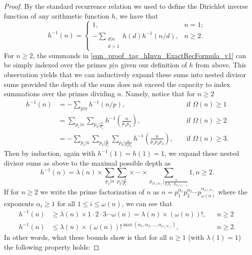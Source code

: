 \documentclass[11pt,reqno,a4letter]{article}
\numberwithin{figure}{section}
\numberwithin{table}{section}
\theoremstyle{plain}
\numberwithin{theorem}{section}
\theoremstyle{definition}
\begin{document}
\begin{proof}
By the standard recurrence relation we used to define the Dirichlet inverse function of any 
arithmetic function $h$, we have that \cite[\S 2.7]{APOSTOLANUMT} 
\begin{equation} 
\label{eqn_proof_tag_hInvn_ExactRecFormula_v1}
h^{-1}(n) = \begin{cases} 
            1, & n = 1; \\ 
            -\sum\limits_{\substack{d|n \\ d>1}} h(d) h^{-1}(n/d), & n \geq 2. 
            \end{cases} 
\end{equation} 
For $n \geq 2$, the summands in \eqref{eqn_proof_tag_hInvn_ExactRecFormula_v1} 
can be simply indexed over the primes $p|n$ given our definition of $h$ from above. 
This observation yields that we can inductively 
expand these sums into nested divisor sums provided the depth of the sums does not exceed the 
capacity to index summations over the primes dividing $n$. Namely, notice that for $n \geq 2$ 
\begin{align*} 
h^{-1}(n) & = -\sum_{p|n} h^{-1}(n/p), && \text{\ if\ } \Omega(n) \geq 1 \\ 
     & = \sum_{p_1|n} \sum_{p_2|\frac{n}{p_1}} h^{-1}\left(\frac{n}{p_1p_2}\right), && \text{\ if\ } \Omega(n) \geq 2 \\ 
     & = -\sum_{p_1|n} \sum_{p_2|\frac{n}{p_1}} \sum_{p_3|\frac{n}{p_1p_2}} h^{-1}\left(\frac{n}{p_1p_2p_3}\right), 
     && \text{\ if\ } \Omega(n) \geq 3. 
\end{align*} 
Then by induction, again with $h^{-1}(1) = h(1) = 1$, we expand these 
nested divisor sums as above to the maximal possible depth as 
\[
h^{-1}(n) = \lambda(n) \times \sum_{p_1|n} \sum_{p_2|\frac{n}{p_1}} \times \cdots \times 
     \sum_{p_{\Omega(n)}|\frac{n}{p_1p_2 \cdots p_{\Omega(n)-1}}} 1, n \geq 2. 
\]
If for $n \geq 2$ we write the prime factorization of $n$ as 
$n = p_1^{\alpha_1} p_2^{\alpha_2} \cdots p_{\omega(n)}^{\alpha_{\omega(n)}}$ where the exponents $\alpha_i \geq 1$ 
for all $1 \leq i \leq \omega(n)$, we can see that 
\begin{align*} 
h^{-1}(n) & \geq \lambda(n) \times 1 \cdot 2 \cdot 3 \cdots \omega(n) = \lambda(n) \times (\omega(n))!, && n \geq 2 \\ 
h^{-1}(n) & \leq \lambda(n) \times (\omega(n))!^{\max(\alpha_1, \alpha_2, \ldots, \alpha_{\omega(n)})}, && n \geq 2. 
\end{align*} 
In other words, what these bounds show is that for all $n \geq 1$ (with $\lambda(1) = 1$) the following property holds: 

\end{proof}
\end{document}
